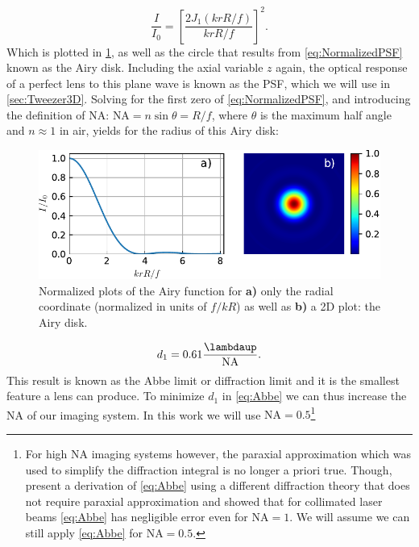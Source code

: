 \begin{equation}\label{eq:NormalizedPSF}
    \frac{I}{I_0} = \left[
    \frac{2J_1(k r R/f)}{k r R/f}
    \right]^2.
\end{equation}
Which is plotted in \cref{fig:AiryPlots}, as well as the circle that results from \cref{eq:NormalizedPSF} known as the Airy disk.
Including the axial variable $z$ again, the optical response of a perfect lens to this plane wave is known as the \ac{PSF}, which we will use in \cref{sec:Tweezer3D}.
Solving for the first zero of \cref{eq:NormalizedPSF}, and introducing the definition of \ac{NA}: $\text{NA} = n \sin{\theta} =  R/f$, where $\theta$ is the maximum half angle and $n\approx1$ in air, yields for the radius of this Airy disk:

\begin{figure}
    \centering
    \includegraphics[width = 0.9\linewidth]{figures/AiryDisk.pdf}
    \caption{Normalized plots of the Airy function for \textbf{a)} only the radial coordinate (normalized in units of $f/kR$) as well as \textbf{b)} a 2D plot: the Airy disk.}
    \label{fig:AiryPlots}
\end{figure}

\begin{equation}\label{eq:Abbe}
    d_1 = 0.61 \frac{\lambdaup}{\text{NA}}.
\end{equation}
This result is known as the Abbe limit or diffraction limit \cite{Abbe1882} and it is the smallest feature a lens can produce.
To minimize $d_1$ in \cref{eq:Abbe} we can thus increase the \ac{NA} of our imaging system. 
In this work we will use $\text{NA} = 0.5$\footnote{For high NA imaging systems however, the paraxial approximation which was used to simplify the diffraction integral is no longer a priori true. 
Though, \cite{Chon2007} present a derivation of \cref{eq:Abbe} using a different diffraction theory that does not require paraxial approximation and showed that for collimated laser beams \cref{eq:Abbe} has negligible error even for $\text{NA} = 1$. 
We will assume we can still apply \cref{eq:Abbe} for $\text{NA} = 0.5$.}

